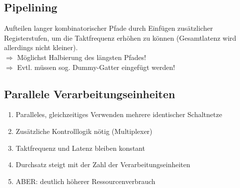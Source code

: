\documentclass[a4paper,twocolumn,10pt]{article}
\begin{document}
\subsection*{Pipelining}
Aufteilen langer kombinatorischer Pfade durch Einfügen zusätzlicher Registerstufen, um die Taktfrequenz erhöhen zu können (Gesamtlatenz wird allerdings nicht kleiner).\\
$\Rightarrow$ Möglichst Halbierung des längsten Pfades!\\
$\Rightarrow$ Evtl. müssen sog. \glqq Dummy-Gatter\grqq\; eingefügt werden!

\subsection*{Parallele Verarbeitungseinheiten}
\begin{enumerate}[label=-,leftmargin=5mm]
	\item Paralleles, gleichzeitiges Verwenden mehrere identischer Schaltnetze
	\item Zusätzliche Kontrolllogik nötig (Multiplexer)
	\item Taktfrequenz und Latenz bleiben konstant
	\item Durchsatz steigt mit der Zahl der Verarbeitungseinheiten
	\item ABER: deutlich höherer Ressourcenverbrauch
\end{enumerate}
\end{document}
